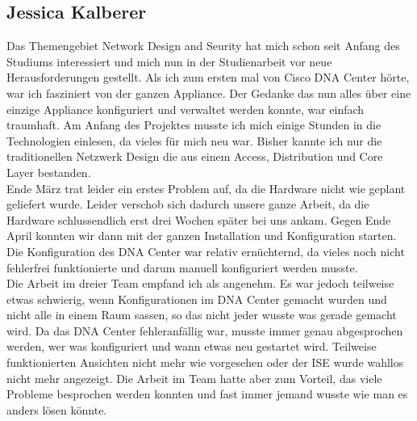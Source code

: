 \subsection{Jessica Kalberer}
Das Themengebiet Network Design and Seurity hat mich schon seit Anfang des Studiums interessiert und mich nun in der Studienarbeit vor neue Herausforderungen gestellt. Als ich zum ersten mal von Cisco DNA Center hörte, war ich fasziniert von der ganzen Appliance. Der Gedanke das nun alles über eine einzige Appliance konfiguriert und verwaltet werden konnte, war einfach traumhaft. Am Anfang des Projektes musste ich mich einige Stunden in die  Technologien einlesen, da vieles für mich neu war. Bisher kannte ich nur die traditionellen Netzwerk Design die aus einem Access, Distribution und Core Layer bestanden.\\ 
Ende März trat leider ein erstes Problem auf, da die Hardware nicht wie geplant geliefert wurde. Leider verschob sich dadurch unsere ganze Arbeit, da die Hardware schlussendlich erst drei Wochen später bei uns ankam. Gegen Ende April konnten wir dann mit der ganzen Installation und Konfiguration starten. Die Konfiguration des DNA Center war relativ ernüchternd, da vieles noch nicht fehlerfrei funktionierte und darum manuell konfiguriert werden musste. \\
Die Arbeit im dreier Team empfand ich als angenehm. Es war jedoch teilweise etwas schwierig, wenn Konfigurationen im DNA Center gemacht wurden und nicht alle in einem Raum sassen, so das nicht jeder wusste was gerade gemacht wird. Da das DNA Center fehleranfällig war, musste immer genau abgesprochen werden, wer was konfiguriert und wann etwas neu gestartet wird. Teilweise funktionierten Ansichten nicht mehr wie vorgesehen oder der ISE wurde wahllos nicht mehr angezeigt. Die Arbeit im Team hatte aber zum Vorteil, das viele Probleme besprochen werden konnten und fast immer jemand wusste wie man es anders lösen könnte.